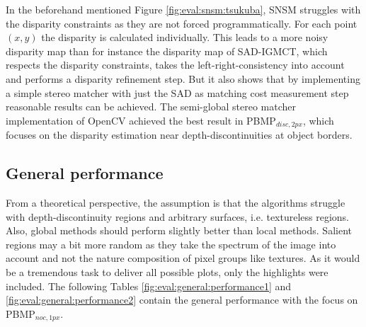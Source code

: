 \noindent In the beforehand mentioned Figure \ref{fig:eval:snsm:tsukuba}, SNSM struggles with the disparity constraints as they are not forced programmatically.
For each point $(x,y)$ the disparity is calculated individually.
This leads to a more noisy disparity map than for instance the disparity map of SAD-IGMCT, which respects the disparity constraints, takes the left-right-consistency into account and performs a disparity refinement step.
But it also shows that by implementing a simple stereo matcher with just the SAD as matching cost measurement step reasonable results can be achieved.
The semi-global stereo matcher implementation of OpenCV achieved the best result in PBMP$_{disc,2px}$, which focuses on the disparity estimation near depth-discontinuities at object borders.


\newpage
\subsection{General performance}

From a theoretical perspective, the assumption is that the algorithms struggle with depth-discontinuity regions and arbitrary surfaces, i.e. textureless regions.
Also, global methods should perform slightly better than local methods.
Salient regions may a bit more random as they take the spectrum of the image into account and not the nature composition of pixel groups like textures.
As it would be a tremendous task to deliver all possible plots, only the highlights were included.
\newline\newline\noindent The following Tables \ref{fig:eval:general:performance1} and \ref{fig:eval:general:performance2} contain the general performance with the focus on PBMP$_{noc,1px}$.

